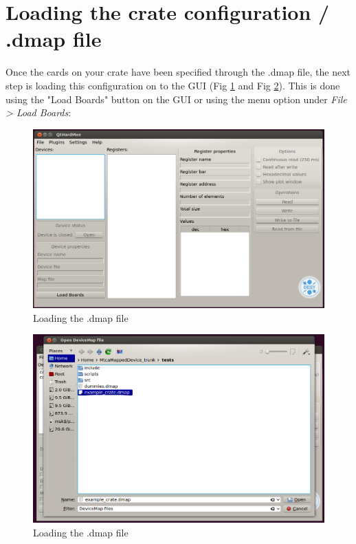 \section{Loading the crate configuration / .dmap file}
Once the cards on your crate have been specified through the .dmap file, the next step is loading this configuration on to the GUI (Fig \ref{load_boards_button} and Fig \ref{load_boards_open_menu_to_load_dmap}). This is done using the "Load Boards" button on the GUI or using the menu option under \textit{File > Load Boards}:

\begin{figure}[htbp]
\centering
\includegraphics[width=1\textwidth]{images/load_boards_1.png}
 \caption{Loading the .dmap file}
\label{load_boards_button}
\end{figure}

\begin{figure}[htbp]
\centering
\includegraphics[width=1\textwidth]{images/load_boards_2.png}
 \caption{Loading the .dmap file}
\label{load_boards_open_menu_to_load_dmap}
\end{figure}

